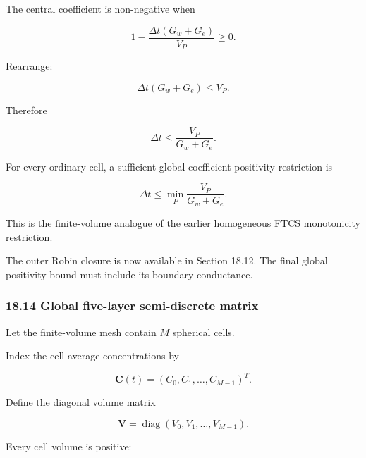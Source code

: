 \documentclass[11pt,a4paper]{article}
\begin{document}
The central coefficient is non-negative when

\begin{equation}
1-
\frac{\Delta t(G_w+G_e)}{V_P}
\ge0.
\tag{TRISO-FV-602}
\label{eq:triso-fv-602}
\end{equation}

Rearrange:

\begin{equation}
\Delta t(G_w+G_e)
\le
V_P.
\tag{TRISO-FV-603}
\label{eq:triso-fv-603}
\end{equation}

Therefore

\begin{equation}
\boxed{
\Delta t
\le
\frac{V_P}{G_w+G_e}.
}
\tag{TRISO-FV-604}
\label{eq:triso-fv-604}
\end{equation}

For every ordinary cell, a sufficient global coefficient-positivity restriction is

\begin{equation}
\boxed{
\Delta t
\le
\min_P
\frac{V_P}{G_w+G_e}.
}
\tag{TRISO-FV-605}
\label{eq:triso-fv-605}
\end{equation}

This is the finite-volume analogue of the earlier homogeneous FTCS monotonicity restriction.

The outer Robin closure is now available in Section 18.12. The final global positivity bound must include its boundary conductance.

\subsubsection*{18.14 Global five-layer semi-discrete matrix}

Let the finite-volume mesh contain $M$ spherical cells.

Index the cell-average concentrations by

\begin{equation}
\mathbf C(t)
=
(C_0,C_1,\ldots,C_{M-1})^T.
\tag{TRISO-FV-233}
\label{eq:triso-fv-233}
\end{equation}

Define the diagonal volume matrix

\begin{equation}
\boxed{
\mathbf V
=
\operatorname{diag}
(V_0,V_1,\ldots,V_{M-1}).
}
\tag{TRISO-FV-234}
\label{eq:triso-fv-234}
\end{equation}

Every cell volume is positive:
\end{document}
